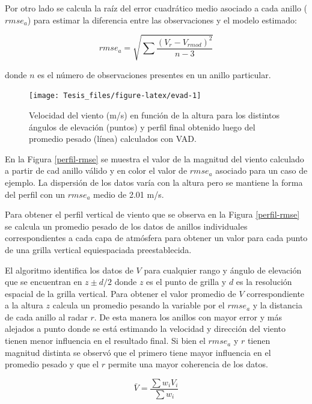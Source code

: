 \documentclass[12pt,spanish,oneside, a4paper]{book}
\begin{document}
Por otro lado se calcula la raíz del error cuadrático medio asociado a
cada anillo (\(rmse_a\)) para estimar la diferencia entre las
observaciones y el modelo estimado:

\begin{equation}\label{eq-vr8}
rmse_a = \sqrt {\sum \frac {(V_r - V_{rmod} )^2} {n-3}}
\end{equation}

donde \(n\) es el número de observaciones presentes en un anillo
particular.

\begin{figure}

{\centering \texttt{[image: Tesis\_files/figure-latex/evad-1]} 

}

\caption{Velocidad del viento (m/s) en función de la altura para los distintos ángulos de elevación (puntos) y perfil final obtenido luego del promedio pesado (línea) calculados con VAD. \label{perfil-rmse}}\label{fig:evad}
\end{figure}

En la Figura \ref{perfil-rmse} se muestra el valor de la magnitud del
viento calculado a partir de cad anillo válido y en color el valor de
\(rmse_a\) asociado para un caso de ejemplo. La dispersión de los datos
varía con la altura pero se mantiene la forma del perfil con un
\(rmse_a\) medio de 2.01 m/s.

Para obtener el perfil vertical de viento que se observa en la Figura
\ref{perfil-rmse} se calcula un promedio pesado de los datos de anillos
individuales correspondientes a cada capa de atmósfera para obtener un
valor para cada punto de una grilla vertical equiespaciada
preestablecida.

El algoritmo identifica los datos de \(V\) para cualquier rango y ángulo
de elevación que se encuentran en \(z \pm d/2\) donde \(z\) es el punto
de grilla y \(d\) es la resolución espacial de la grilla vertical. Para
obtener el valor promedio de \(V\) correspondiente a la altura \(z\)
calcula un promedio pesando la variable por el \(rmse_a\) y la distancia
de cada anillo al radar \(r\). De esta manera los anillos con mayor
error y más alejados a punto donde se está estimando la velocidad y
dirección del viento tienen menor influencia en el resultado final. Si
bien el \(rmse_a\) y \(r\) tienen magnitud distinta se observó que el
primero tiene mayor influencia en el promedio pesado y que el \(r\)
permite una mayor coherencia de los datos.

\begin{equation}\label{eq-vr9}
\bar{V} = \frac {\sum w_i V_i} {\sum w_i}
\end{equation}
\end{document}
